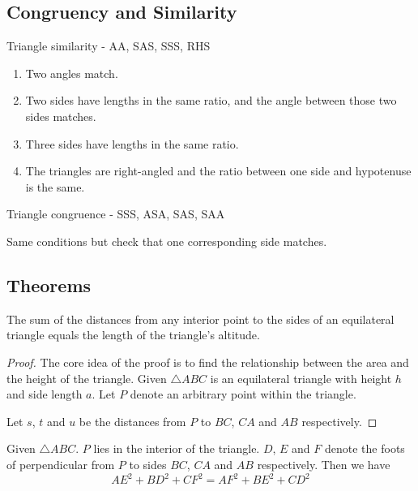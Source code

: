 \subsection{Congruency and Similarity}
Triangle similarity - AA, SAS, SSS, RHS
\begin{enumerate}
\item Two angles match.
\item Two sides have lengths in the same ratio, and the angle between those two sides matches.
\item Three sides have lengths in the same ratio.
\item The triangles are right-angled and the ratio between one side and hypotenuse is the same.
\end{enumerate}

Triangle congruence - SSS, ASA, SAS, SAA

Same conditions but check that one corresponding side matches.

\subsection{Theorems}
\begin{theorem}
The sum of the distances from any interior point to the sides of an equilateral triangle equals the length of the triangle's altitude. 
\end{theorem}

\begin{proof}
The core idea of the proof is to find the relationship between the area and the height of the triangle. Given $\triangle ABC$ is an equilateral triangle with height $h$ and side length $a$. Let $P$ denote an arbitrary point within the triangle.

Let $s$, $t$ and $u$ be the distances from $P$ to $BC$, $CA$ and $AB$ respectively. 
\end{proof}

\begin{theorem}
Given $\triangle ABC$. $P$ lies in the interior of the triangle. $D$, $E$ and $F$ denote the foots of perpendicular from $P$ to sides $BC$, $CA$ and $AB$ respectively. Then we have
\begin{equation}
AE^2+BD^2+CF^2=AF^2+BE^2+CD^2
\end{equation}
\end{theorem}

